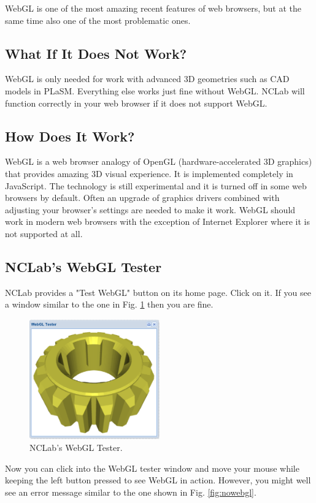 \documentclass{article}
\begin{document}
WebGL is one of the most amazing recent features of web browsers, but at the same time also one of the most 
problematic ones. 

\subsection*{What If It Does Not Work?}

WebGL is only needed for work with advanced 3D geometries such as CAD models in PLaSM. Everything else 
works just fine without WebGL. NCLab will function correctly in your web browser if it does not 
support WebGL.

\subsection*{How Does It Work?}

WebGL is a web browser analogy of OpenGL 
(hardware-accelerated 3D graphics) that provides amazing 3D visual experience. It is 
implemented completely in JavaScript. The technology is 
still experimental and it is turned off in some web browsers by default. Often an upgrade of 
graphics drivers combined with adjusting your browser's settings are needed to make it work. 
WebGL should work in modern web browsers with the exception of Internet Explorer 
where it is not supported at all.

\subsection*{NCLab's WebGL Tester}

NCLab provides a "Test WebGL" button on its home page. Click on it.
If you see a window similar to the one in Fig. \ref{fig:webgl2} then you are fine. \\

\begin{figure}[!ht]
\begin{center}
\includegraphics[width=0.5\textwidth]{img/webgl2.png}
\end{center}
\vspace{-4mm}
\caption{NCLab's WebGL Tester.}
\label{fig:webgl2}
\end{figure}
\noindent
Now you can click into the WebGL tester window and move 
your mouse while keeping the left button pressed to see WebGL in action.
However, you might well see an error message similar to the one shown in Fig. \ref{fig:nowebgl}.\\
\end{document}
